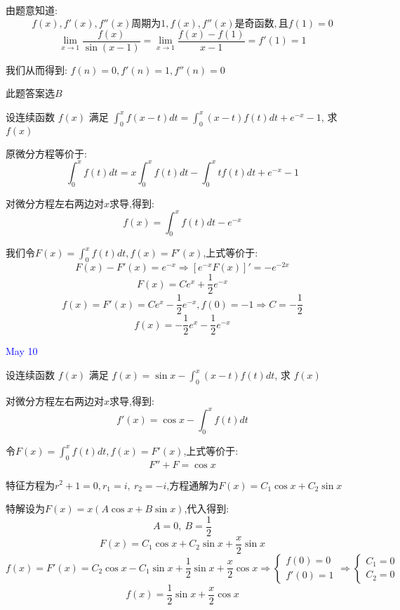 \begin{solution}
	
	由题意知道: $$f(x),f'(x),f''(x)\text{周期为}1,f(x),f''(x)\text{是奇函数},\text{且}f(1)=0$$
	$$\lim\limits_{x\to 1}\frac{f(x)}{\sin(x-1)}=\lim\limits_{x\to 1}\frac{f(x)-f(1)}{x-1}=f'(1)=1$$
	
	我们从而得到: $f(n)=0,f'(n)=1,f''(n)=0$
	
	此题答案选$B$
\end{solution}

\begin{example}[][Exam: 31.2.4]
	设连续函数 $f(x)$ 满足 $\int_{0}^{x}f(x-t)dt=\int_{0}^{x}(x-t)f(t)dt+e^{-x}-1$, 求 $f(x)$
\end{example}

\begin{solution}
	
	原微分方程等价于: 
	$$\int_{0}^{x}f(t)dt=x\int_{0}^{x}f(t)dt-\int_{0}^{x}tf(t)dt+e^{-x}-1$$
	
	对微分方程左右两边对$x$求导,得到: 
	$$f(x)=\int_{0}^{x}f(t)dt-e^{-x}$$
	
	我们令$F(x)=\int_{0}^{x}f(t)dt,f(x)=F'(x)$,上式等价于: 
	$$F(x)-F'(x)=e^{-x}\Rightarrow [e^{-x}F(x)]'=-e^{-2x}$$
	$$F(x)=Ce^{x}+\frac{1}{2}e^{-x}$$
	$$f(x)=F'(x)=Ce^{x}-\frac{1}{2}e^{-x},f(0)=-1\Rightarrow C=-\frac{1}{2}$$
	$$f(x)=-\frac{1}{2}e^{x}-\frac{1}{2}e^{-x}$$
\end{solution}


\textcolor{blue}{May 10}

\begin{example}[][Exam: 31.2.5]
	设连续函数 $f(x)$ 满足 $f(x)=\sin x-\int_{0}^{x}(x-t)f(t)dt$, 求 $f(x)$
\end{example}

\begin{solution}
	
	对微分方程左右两边对$x$求导,得到: 
	$$f'(x)=\cos x-\int_{0}^{x}f(t)dt$$
	
	令$F(x)=\int_{0}^{x}f(t)dt,f(x)=F'(x)$,上式等价于: 
	$$F''+F=\cos x$$
	
	特征方程为$r^2+1=0,r_{1}=i,\ r_{2}=-i$,方程通解为$F(x)=C_{1}\cos x+C_{2}\sin x$
	
	特解设为$F(x)=x(A\cos x+B\sin x)$,代入得到: 
	$$A=0,\ B=\frac{1}{2}$$
	$$F(x)=C_{1}\cos x+C_{2}\sin x+\frac{x}{2}\sin x$$
	$$f(x)=F'(x)=C_{2}\cos x-C_{1}\sin x+\frac{1}{2}\sin x+\frac{x}{2}\cos x\Rightarrow \left\lbrace 
	\begin{array}{l}
		f(0)=0\\
		f'(0)=1
	\end{array}
	\right. \Rightarrow \left\lbrace 
	\begin{array}{l}
		C_{1}=0\\
		C_{2}=0
	\end{array}
	\right. $$
	$$f(x)=\frac{1}{2}\sin x+\frac{x}{2}\cos x$$
\end{solution}

